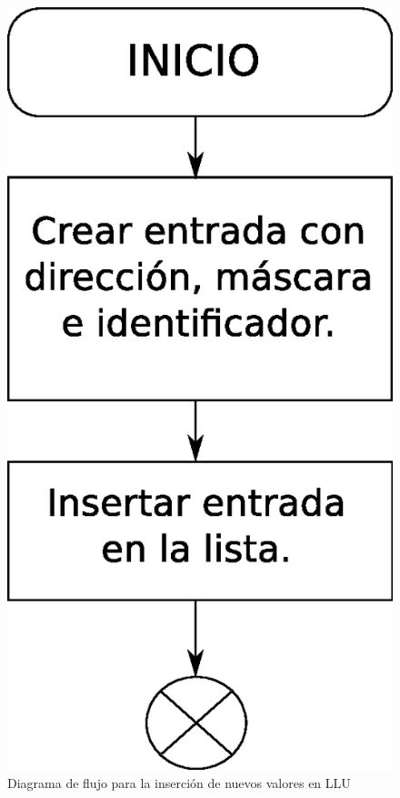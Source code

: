 \begin{figure}[H]
  \centering
	\includegraphics[scale=0.5]{4-implementacion/graf/lluinsert.eps}
  \caption{Diagrama de flujo para la inserción de nuevos valores en LLU}
  \label{fig:lluinsert}
\end{figure}

